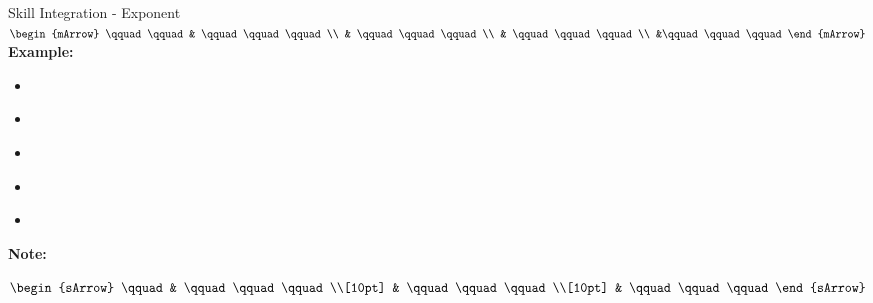 \clearpage
{}
\begin{boxSkill}{Skill \thenskill \quad Integration - Exponent}
    \noindent%
	 $\begin{mArrow}
        \qquad \qquad &    \qquad\qquad\qquad          \\
                      & \qquad\qquad\qquad \\
			          & \qquad\qquad\qquad  \\
			          &\qquad\qquad\qquad
 	 \end{mArrow}$\\[0.5cm]
	 

	\textbf{Example:}
	\begin{itemize}[leftmargin=0.8cm]
	     \item[] $\qquad\qquad\qquad    $
	     \item[] $\qquad\qquad\qquad     $
	     \item[] $\qquad\qquad\qquad      $ 
	     \item[] $\qquad\qquad\qquad    $
	     \item[] $\qquad\qquad\qquad  $	 
	\end{itemize}
	
	\tcbline
	
    \textbf{Note:}\\[0.6cm]
	\begin{warningEnv}
	    $\begin{sArrow}
	        \qquad   & \qquad\qquad\qquad  \\[10pt]
	  	             & \qquad\qquad\qquad  \\[10pt] 
                     & \qquad\qquad\qquad 				   
		 \end{sArrow}$		   
    \end{warningEnv}
\end{boxSkill}

